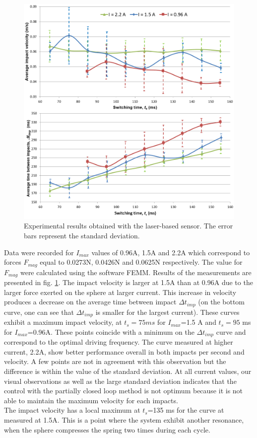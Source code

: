 \documentclass[letterpaper, 10 pt, conference]{ieeeconf}  %
\begin{document}
\begin{figure}
  \includegraphics[width=\linewidth]{laser_exp.png}
  \caption{Experimental results obtained with the laser-based sensor. The error bars represent the standard deviation.}
  \label{laser_exp}
	\vspace{-2em}
\end{figure}

Data were recorded for $I_{max}$ values of 0.96A, 1.5A and 2.2A which correspond to forces $F_{mag}$ equal to 0.0273N, 0.0426N and 0.0625N respectively. The value for $F_{mag}$ were calculated using the software FEMM. Results of the measurements are presented in fig. \ref{laser_exp}. The impact velocity is larger at 1.5A than at 0.96A due to the larger force exerted on the sphere at larger current. This increase in velocity produces a decrease on the average time between impact $\Delta t_{imp}$ (on the bottom curve, one can see that $\Delta t_{imp}$ is smaller for the largest current). These curves exhibit a maximum impact velocity, at $t_s=75ms$ for $I_{max}$=1.5 A and $t_s=95$ ms for $I_{max}$=0.96A. These points coincide with a minimum on the $\Delta t_{imp}$ curve and correspond to the optimal driving frequency. The curve measured at higher current, 2.2A, show better performance overall in both impacts per second and velocity. A few points are not in agreement with this observation but the difference is within the value of the standard deviation. At all current values, our visual observations as well as the large standard deviation indicates that the control with the partially closed loop method is not optimum because it is not able to maintain the maximum velocity for each impacts.\\
The impact velocity has a local maximum at $t_s$=135 ms for the curve at measured at 1.5A. This is a point where the system exhibit another resonance, when the sphere compresses the spring two times during each cycle.
\end{document}
